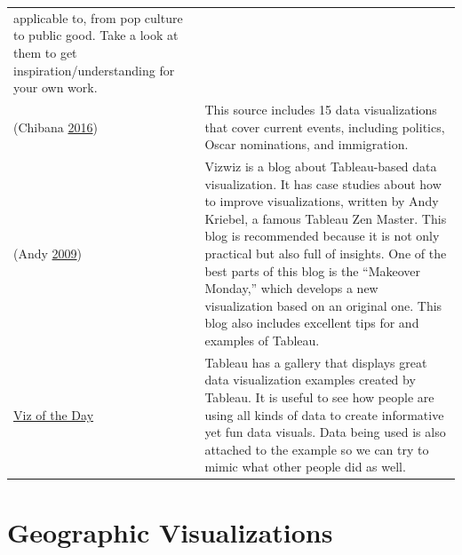 \documentclass[]{book}
\theoremstyle{definition}
\theoremstyle{definition}
\theoremstyle{definition}
\theoremstyle{remark}
\begin{document}
\begin{longtable}[]{@{}ll@{}}
\begin{minipage}[t]{0.79\columnwidth}
applicable to, from pop culture to public good. Take a look at them to
get inspiration/understanding for your own work.\strut
\end{minipage}\tabularnewline
\begin{minipage}[t]{0.15\columnwidth}\raggedright\strut
(Chibana \protect\hyperlink{ref-int_viz_current}{2016})\strut
\end{minipage} & \begin{minipage}[t]{0.79\columnwidth}\raggedright\strut
This source includes 15 data visualizations that cover current events,
including politics, Oscar nominations, and immigration.\strut
\end{minipage}\tabularnewline
\begin{minipage}[t]{0.15\columnwidth}\raggedright\strut
(Andy \protect\hyperlink{ref-vizwiz}{2009})\strut
\end{minipage} & \begin{minipage}[t]{0.79\columnwidth}\raggedright\strut
Vizwiz is a blog about Tableau-based data visualization. It has case
studies about how to improve visualizations, written by Andy Kriebel, a
famous Tableau Zen Master. This blog is recommended because it is not
only practical but also full of insights. One of the best parts of this
blog is the ``Makeover Monday,'' which develops a new visualization
based on an original one. This blog also includes excellent tips for and
examples of Tableau.\strut
\end{minipage}\tabularnewline
\begin{minipage}[t]{0.15\columnwidth}\raggedright\strut
\href{https://public.tableau.com/en-us/s/gallery}{Viz of the Day}\strut
\end{minipage} & \begin{minipage}[t]{0.79\columnwidth}\raggedright\strut
Tableau has a gallery that displays great data visualization examples
created by Tableau. It is useful to see how people are using all kinds
of data to create informative yet fun data visuals. Data being used is
also attached to the example so we can try to mimic what other people
did as well.\strut
\end{minipage}\tabularnewline
\bottomrule
\end{longtable}

\section{Geographic Visualizations}\label{geographic-visualizations}
\end{document}
